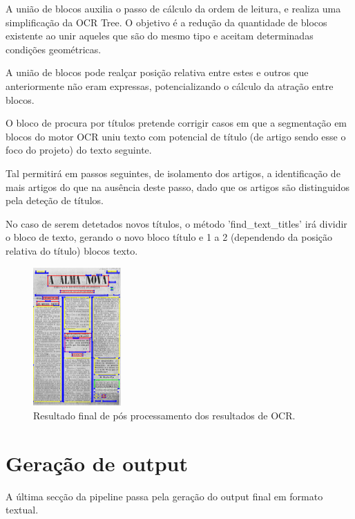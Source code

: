A união de blocos auxilia o passo de cálculo da ordem de leitura, e realiza uma simplificação da OCR Tree. O objetivo é a redução da quantidade de blocos existente ao unir aqueles que são do mesmo tipo e aceitam determinadas condições geométricas.

A união de blocos pode realçar posição relativa entre estes e outros que anteriormente não eram expressas, potencializando o cálculo da atração entre blocos.





O bloco de procura por títulos pretende corrigir casos em que a segmentação em blocos do motor OCR uniu texto com potencial de título (de artigo sendo esse o foco do projeto) do texto seguinte.

Tal permitirá em passos seguintes, de isolamento dos artigos, a identificação de mais artigos do que na ausência deste passo, dado que os artigos são distinguidos pela deteção de títulos.

No caso de serem detetados novos títulos, o método 'find\_text\_titles' irá dividir o bloco de texto, gerando o novo bloco título e 1 a 2 (dependendo da posição relativa do título) blocos texto.

\begin{figure}[H]
	\centering
	\includegraphics[width=0.3\textwidth]{images/ilustracoes/pipeline_final_example.png}
	\caption{Resultado final de pós processamento dos resultados de OCR.}
	\label{fig:pipeline_final_example}
\end{figure}



\section{Geração de output}

A última secção da pipeline passa pela geração do output final em formato textual. 

